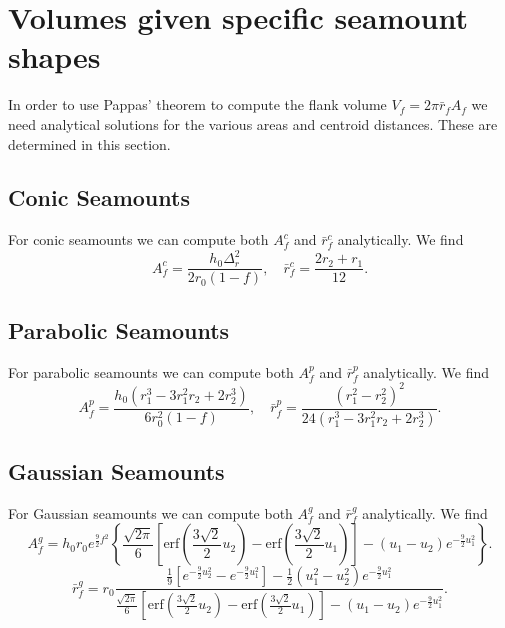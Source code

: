\documentclass[12pt,letterpaper,margin=0.5in]{report}
\begin{document}
\section{Volumes given specific seamount shapes}

In order to use Pappas' theorem to compute the flank volume $V_f = 2 \pi \bar{r}_f A_f$ we need analytical
solutions for the various areas and centroid distances.  These are determined in this section.

\subsection{Conic Seamounts}

For conic seamounts we can compute both $A_f^c$ and $\bar{r}_f^c$ analytically.  We find
\begin{equation}
A_f^c = \frac{h_0 \Delta_r^2}{2 r_0 (1-f)}, \quad \bar{r}_f^c = \frac{2 r_2 + r_1}{12}.
\end{equation}

\subsection{Parabolic Seamounts}

For parabolic seamounts we can compute both $A_f^p$ and $\bar{r}_f^p$ analytically.  We find
\begin{equation}
A_f^p = \frac{h_0 \left ( r_1^3 - 3 r_1^2 r_2 + 2 r_2^3\right)}{6 r_0^2 (1-f)}, \quad \bar{r}_f^p = \frac{\left (r_1^2 - r_2^2 \right )^2}{24 \left ( r_1^3 - 3 r_1^2 r_2 + 2 r_2^3\right)}.
\end{equation}

\subsection{Gaussian Seamounts}

For Gaussian seamounts we can compute both $A_f^g$ and $\bar{r}_f^g$ analytically.  We find
\begin{equation}
A_f^g = h_0 r_0 e^{\frac{9}{2}f^2} \left \{ \frac{\sqrt{2\pi}}{6} \left [\mbox{erf} \left ( \frac{3\sqrt{2}}{2}u_2\right ) - \mbox{erf} \left ( \frac{3\sqrt{2}}{2}u_1 \right ) \right ] - (u_1 - u_2)e^{-\frac{9}{2} u_1^2} \right \}.
\end{equation}
\begin{equation}
\bar{r}_f^g = r_0\frac{\frac{1}{9} \left [e^{-\frac{9}{2}u_2^2} - e^{-\frac{9}{2}u_1^2} \right ] - \frac{1}{2}\left (u_1^2 - u_2^2 \right )e^{-\frac{9}{2}u_1^2}}{\frac{\sqrt{2\pi}}{6}\left [\mbox{erf} \left ( \frac{3\sqrt{2}}{2}u_2\right ) - \mbox{erf} \left ( \frac{3\sqrt{2}}{2}u_1 \right ) \right ] - (u_1 - u_2)e^{-\frac{9}{2}u_1^2}}.
\end{equation}
\end{document}
